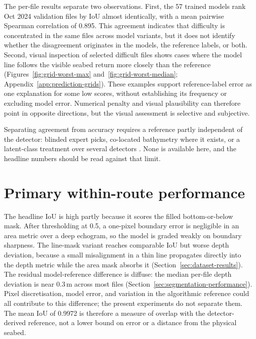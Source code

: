The per-file results separate two observations. First, the 57 trained models rank Oct 2024 validation files by IoU almost identically, with a mean pairwise Spearman correlation of 0.895. This agreement indicates that difficulty is concentrated in the same files across model variants, but it does not identify whether the disagreement originates in the models, the reference labels, or both. Second, visual inspection of selected difficult files shows cases where the model line follows the visible seabed return more closely than the reference (Figures~\ref{fig:grid-worst-max} and~\ref{fig:grid-worst-median}; Appendix~\ref{app:prediction-grids}). These examples support reference-label error as one explanation for some low scores, without establishing its frequency or excluding model error. Numerical penalty and visual plausibility can therefore point in opposite directions, but the visual assessment is selective and subjective.

Separating agreement from accuracy requires a reference partly independent of the detector: blinded expert picks, co-located bathymetry where it exists, or a latent-class treatment over several detectors \cite{hui_estimating_1980,rutjes_evaluation_2007}. None is available here, and the headline numbers should be read against that limit.

\section{Primary within-route performance}

The headline IoU is high partly because it scores the filled bottom-or-below mask. After thresholding at 0.5, a one-pixel boundary error is negligible in an area metric over a deep echogram, so the model is graded weakly on boundary sharpness. The line-mask variant reaches comparable IoU but worse depth deviation, because a small misalignment in a thin line propagates directly into the depth metric while the area mask absorbs it (Section~\ref{sec:dataset-results}). The residual model-reference difference is diffuse: the median per-file depth deviation is near 0.3\,m across most files (Section~\ref{sec:segmentation-performance}). Pixel discretisation, model error, and variation in the algorithmic reference could all contribute to this difference; the present experiments do not separate them. The mean IoU of 0.9972 is therefore a measure of overlap with the detector-derived reference, not a lower bound on error or a distance from the physical seabed.

